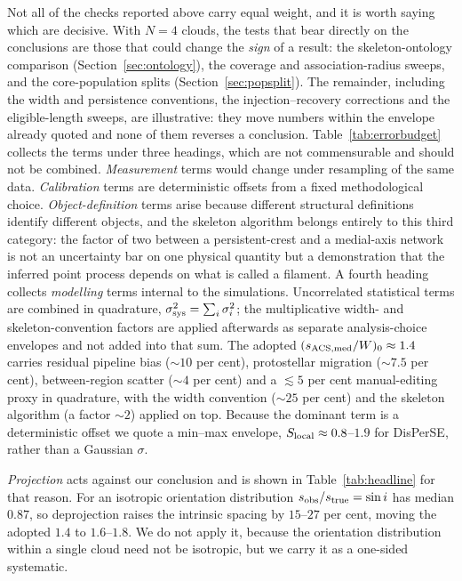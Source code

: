 \documentclass[usenatbib,twoside,twocolumn]{mnras}
\begin{document}
Not all of the checks reported above carry equal weight, and it is worth saying which are decisive. With $N=4$ clouds, the tests that bear directly on the conclusions are those that could change the \emph{sign} of a result: the skeleton-ontology comparison (Section~\ref{sec:ontology}), the coverage and association-radius sweeps, and the core-population splits (Section~\ref{sec:popsplit}). The remainder, including the width and persistence conventions, the injection--recovery corrections and the eligible-length sweeps, are illustrative: they move numbers within the envelope already quoted and none of them reverses a conclusion. Table~\ref{tab:errorbudget} collects the terms under three headings, which are not commensurable and should not be combined. \emph{Measurement} terms would change under resampling of the same data. \emph{Calibration} terms are deterministic offsets from a fixed methodological choice. \emph{Object-definition} terms arise because different structural definitions identify different objects, and the skeleton algorithm belongs entirely to this third category: the factor of two between a persistent-crest and a medial-axis network is not an uncertainty bar on one physical quantity but a demonstration that the inferred point process depends on what is called a filament. A fourth heading collects \emph{modelling} terms internal to the simulations. Uncorrelated statistical terms are combined in quadrature, $\sigma_{\rm sys}^2=\sum_i\sigma_i^2$; the multiplicative width- and skeleton-convention factors are applied afterwards as separate analysis-choice envelopes  and not added into that sum. The adopted $(s_{\rm ACS,med}/W)_0\approx1.4$ carries residual pipeline bias ($\sim10$ per cent), protostellar migration ($\sim7.5$ per cent), between-region scatter ($\sim4$ per cent) and a $\lesssim5$ per cent manual-editing proxy in quadrature, with the width convention ($\sim25$ per cent) and the skeleton algorithm (a factor $\sim2$) applied on top. Because the dominant term is a deterministic offset we quote a min--max envelope, $S_{\rm local}\approx0.8$--$1.9$ for DisPerSE, rather than a Gaussian $\sigma$.

\emph{Projection} acts against our conclusion and is shown in Table~\ref{tab:headline} for that reason. For an isotropic orientation distribution $s_{\rm obs}/s_{\rm true}=\sin i$ has median $0.87$, so deprojection raises the intrinsic spacing by $15$--$27$ per cent, moving the adopted $1.4$ to $1.6$--$1.8$. We do not apply it, because the orientation distribution within a single cloud need not be isotropic, but we carry it as a one-sided systematic.
\end{document}
